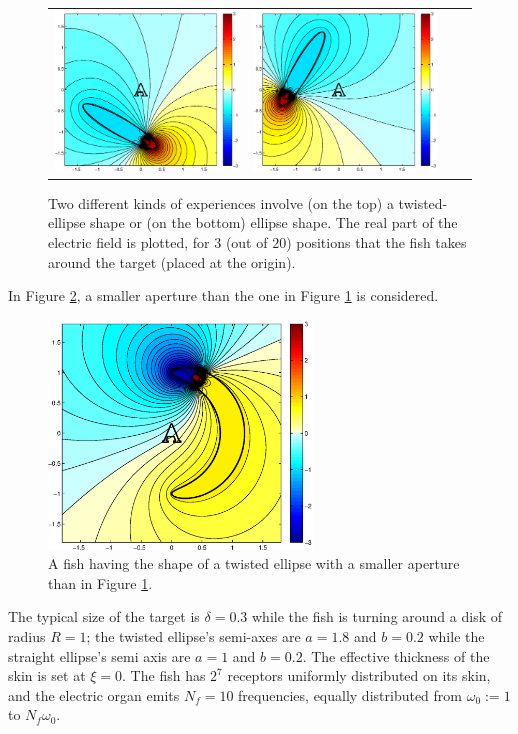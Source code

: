 \begin{figure}[!h]
\begin{tabular}{cccc}
\includegraphics[width=5cm]{pnas/ellipse3} & \includegraphics[width=5cm]{pnas/ellipse4}
\tabularnewline
\end{tabular}
\caption{\label{fig:Setup}Two different kinds of experiences
involve (on the top) a twisted-ellipse shape or (on the bottom)
ellipse shape. The real part of the electric field is plotted, for
$3$ (out of $20$) positions that the fish takes around the target
(placed at the origin).}
\end{figure}

In Figure \ref{fig:aperture}, a smaller aperture than the one in
Figure \ref{fig:Setup} is considered.

\begin{figure}
\centering
\includegraphics[width=7cm]{pnas/aperture}
\caption{\label{fig:aperture} A fish having the shape of a twisted
ellipse with a smaller aperture than in Figure \ref{fig:Setup}.}
\end{figure}

The typical size of the target is $\delta=0.3$ while the fish is
turning around a disk of radius $R=1$; the twisted ellipse's
semi-axes are $a=1.8$ and $b=0.2$ while the straight ellipse's
semi axis are $a=1$ and $b=0.2$. The effective thickness  of the
skin is set at $\xi=0$. The fish has $2^{7}$ receptors uniformly
distributed on its skin, and the electric organ emits $N_f=10$
frequencies, equally distributed from $\omega_{0}:=1$ to
$N_f\omega_{0}$.

